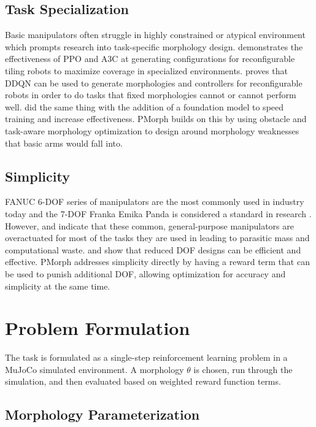 \documentclass[letterpaper, 10 pt, conference]{ieeeconf}  %
\begin{document}
\subsection{Task Specialization}
Basic manipulators often struggle in highly constrained or atypical environment which prompts research into task-specific morphology design.
\cite{kalimuthu2023} demonstrates the effectiveness of PPO and A3C at generating configurations for reconfigurable tiling robots to maximize coverage in specialized environments.
\cite{ding2024modular} proves that DDQN can be used to generate morphologies and controllers for reconfigurable robots in order to do tasks that fixed morphologies cannot or cannot perform well.
\cite{spielberg2025accelerated} did the same thing with the addition of a foundation model to speed training and increase effectiveness.
PMorph builds on this by using obstacle and task-aware morphology optimization to design around morphology weaknesses that basic arms would fall into.

\subsection{Simplicity}
FANUC 6-DOF series of manipulators are the most commonly used in industry today \cite{patentpc2025toprobotics}\cite{standardbots2025fanucprice} and the 7-DOF Franka Emika Panda is considered a standard in research \cite{haddadin2022franka}\cite{oliva2022franksim}.
However, \cite{russo2021task} and \cite{he2019underactuated} indicate that these common, general-purpose manipulators are overactuated for most of the tasks they are used in leading to parasitic mass and computational waste.
\cite{fasquell2020bioinspired} and \cite{nakano2023robostrich} show that reduced DOF designs can be efficient and effective.
PMorph addresses simplicity directly by having a reward term that can be used to punish additional DOF, allowing optimization for accuracy and simplicity at the same time.

\section{Problem Formulation}
\label{sec:problem}

The task is formulated as a single-step reinforcement learning problem in a MuJoCo simulated environment.
A morphology $\theta$ is chosen, run through the simulation, and then evaluated based on weighted reward function terms.

\subsection{Morphology Parameterization}
\end{document}

